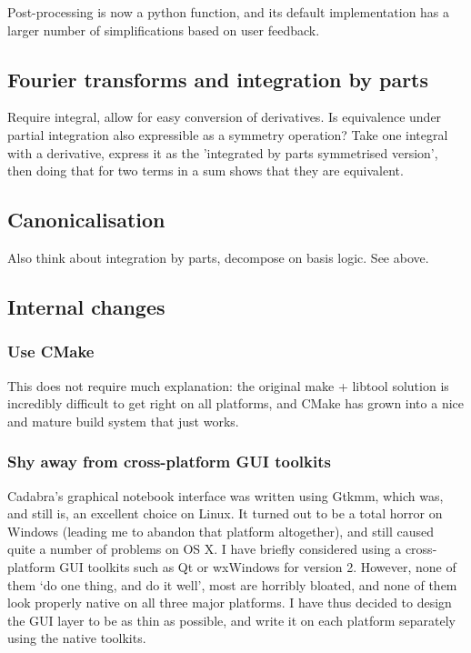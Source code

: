 \documentclass[11pt]{article}
\begin{document}
Post-processing is now a python function, and its default
implementation has a larger number of simplifications based on user
feedback. 


\subsection{Fourier transforms and integration by parts}

Require integral, allow for easy conversion of derivatives. Is
equivalence under partial integration also expressible as a symmetry
operation? Take one integral with a derivative, express it as the
'integrated by parts symmetrised version', then doing that for two
terms in a sum shows that they are equivalent.

\subsection{Canonicalisation}

Also think about integration by parts, decompose on basis logic. See above.


\subsection{Internal changes}
\subsubsection{Use CMake}

This does not require much explanation: the original make + libtool
solution is incredibly difficult to get right on all platforms, and
CMake has grown into a nice and mature build system that just works.

\subsubsection{Shy away from cross-platform GUI toolkits}

Cadabra's graphical notebook interface was written using Gtkmm, which
was, and still is, an excellent choice on Linux. It turned out to be a
total horror on Windows (leading me to abandon that platform
altogether), and still caused quite a number of problems on OS X.  I
have briefly considered using a cross-platform GUI toolkits such as Qt
or wxWindows for version 2. However, none of them `do one thing, and
do it well', most are horribly bloated, and none of them look properly
native on all three major platforms. I have thus decided to design the
GUI layer to be as thin as possible, and write it on each platform
separately using the native toolkits.
\end{document}

